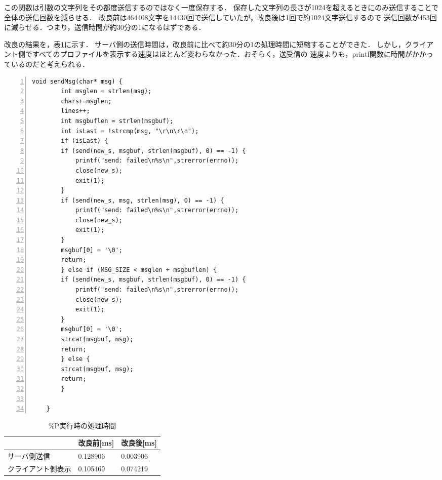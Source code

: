 \documentclass[11pt]{jarticle}
\begin{document}
この関数は引数の文字列をその都度送信するのではなく一度保存する．
保存した文字列の長さが1024を超えるときにのみ送信することで全体の送信回数を減らせる．
改良前は464408文字を14430回で送信していたが，改良後は1回で約1024文字送信するので
送信回数が453回に減らせる．つまり，送信時間が約30分の1になるはずである．

改良の結果を，表\ref{table:P}に示す．
サーバ側の送信時間は，改良前に比べて約30分の1の処理時間に短縮することができた．
しかし，クライアント側ですべてのプロファイルを表示する速度はほとんど変わらなかった．おそらく，送受信の
速度よりも，printf関数に時間がかかっているのだと考えられる．

\begin{lstlisting}[caption=改良したsendMsg,label=sendMsgKAI,numbers=left]
    void sendMsg(char* msg) {
        int msglen = strlen(msg);
        chars+=msglen;
        lines++;
        int msgbuflen = strlen(msgbuf);
        int isLast = !strcmp(msg, "\r\n\r\n");
        if (isLast) {
        if (send(new_s, msgbuf, strlen(msgbuf), 0) == -1) {
            printf("send: failed\n%s\n",strerror(errno));
            close(new_s);
            exit(1);
        }
        if (send(new_s, msg, strlen(msg), 0) == -1) {
            printf("send: failed\n%s\n",strerror(errno));
            close(new_s);
            exit(1);
        }
        msgbuf[0] = '\0';
        return;
        } else if (MSG_SIZE < msglen + msgbuflen) {
        if (send(new_s, msgbuf, strlen(msgbuf), 0) == -1) {
            printf("send: failed\n%s\n",strerror(errno));
            close(new_s);
            exit(1);
        }
        msgbuf[0] = '\0';
        strcat(msgbuf, msg);
        return;
        } else {
        strcat(msgbuf, msg);
        return;
        }
        
    } 
\end{lstlisting}

\begin{table}[h] \caption{\%P実行時の処理時間} \label{table:P}
    \begin{center}
        \begin{tabular}{l|l|l} \hline
             & 改良前[ms] & 改良後[ms] \\ \hline \hline
            サーバ側送信 & 0.128906 & 0.003906 \\ 
            クライアント側表示 & 0.105469 & 0.074219 \\ \hline
        \end{tabular}
    \end{center}
\end{table}
\end{document}
